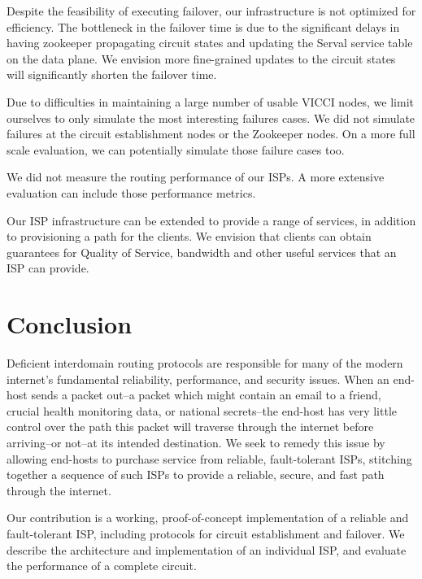 \documentclass{article}
\begin{document}
Despite the feasibility of executing failover, our infrastructure is
not optimized for efficiency. The bottleneck in the failover time is
due to the significant delays in having zookeeper propagating circuit
states and updating the Serval service table on the data plane. We
envision more fine-grained updates to the circuit states will
significantly shorten the failover time.

Due to difficulties in maintaining a large number of usable VICCI
nodes, we limit ourselves to only simulate the most interesting
failures cases. We did not simulate failures at the circuit
establishment nodes or the Zookeeper nodes. On a more full scale
evaluation, we can potentially simulate those failure cases too.

We did not measure the routing performance of our ISPs. A more
extensive evaluation can include those performance metrics.

Our ISP infrastructure can be extended to provide a range of services,
in addition to provisioning a path for the clients. We envision that
clients can obtain guarantees for Quality of Service, bandwidth and
other useful services that an ISP can provide.

\section{Conclusion}
Deficient interdomain routing protocols are responsible for many of
the modern internet's fundamental reliability, performance, and
security issues. When an end-host sends a packet out--a packet which
might contain an email to a friend, crucial health monitoring data, or
national secrets--the end-host has very little control over the path
this packet will traverse through the internet before arriving--or
not--at its intended destination. We seek to remedy this issue by
allowing end-hosts to purchase service from reliable, fault-tolerant
ISPs, stitching together a sequence of such ISPs to provide a
reliable, secure, and fast path through the internet.

Our contribution is a working, proof-of-concept implementation of a
reliable and fault-tolerant ISP, including protocols for circuit
establishment and failover. We describe the architecture and
implementation of an individual ISP, and evaluate the performance of a
complete circuit.



\end{document}
